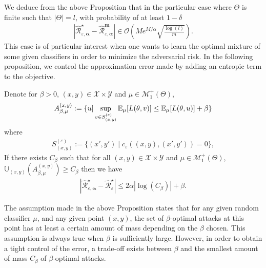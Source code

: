 We deduce from the above Proposition that in the particular case where $\Theta$ is finite such that $|\Theta|= l$, with probability of at least $1-\delta$
\begin{align*}
   |\widehat{\mathcal{R}}_{\varepsilon,\bm{\alpha}}^{\star} - \widehat{\mathcal{R}}_{\varepsilon,\bm{\alpha}}^{\bm{m}}| \in \mathcal{O}\left(Me^{M/\alpha}\sqrt{\frac{\log(l)}{m}} \right).
\end{align*}
This case is of particular interest when one wants to learn the optimal mixture of some given classifiers in order to minimize the adversarial risk. In the following proposition, we control the approximation error made by adding an entropic term to the objective. %
\begin{prop}
\label{prop:control-error-approx}
Denote for $\beta>0$, $(x,y)\in\mathcal{X}\times\mathcal{Y}$ and $\mu\in\mathcal{M}_{1}^{+}(\Theta)$,
    $$A_{\beta,\mu}^{\left(  x,y\right)}:=\{u|\sup_{v\in  S_{(x,y)}^{(\varepsilon)}}\mathbb{E}_{\mu}[\loss(\theta,v)]\leq \mathbb{E}_{\mu}[\loss(\theta,u)]+\beta\}$$ 
    where 
    \begin{align*}
        S_{(x,y)}^{(\varepsilon)}:=\Big\{(x',y')\mid c_{\varepsilon}((x,y),(x',y'))=0\Big\},
    \end{align*}
    If there exists $C_{\beta}$ such that for all $(x,y)\in\mathcal{X}\times\mathcal{Y}$ and $\mu\in\mathcal{M}_{1}^{+}(\Theta)$, $\mathbb{U}_{(x,y)}\left(A_{\beta,\mu}^{\left(  x,y\right)}\right)\geq C_\beta$ then we have
\begin{align*}
   |\widehat{\mathcal{R}}_{\varepsilon,\bm{\alpha}}^{\star} - \widehat{\mathcal{R}}_{\varepsilon}^{\star}|\leq 2\alpha |\log(C_\beta)| + \beta.
\end{align*}
\end{prop}




The assumption made in the above Proposition states that for any given random classifier $\mu$, and any given point $(x,y)$, the set of $\beta$-optimal attacks at this point has at least a certain amount of mass depending on the $\beta$ chosen. This assumption is always true when $\beta$ is sufficiently large. However, in order to obtain a tight control of the error, a trade-off exists between $\beta$ and the smallest amount of mass $C_{\beta}$ of $\beta$-optimal attacks.

